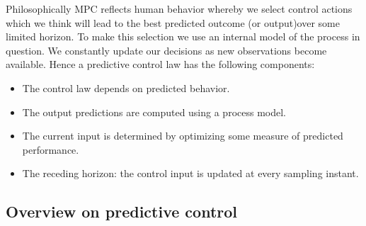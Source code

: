 Philosophically MPC reflects human behavior whereby we select control actions which we think will lead to the best predicted outcome (or output)over some limited horizon. To make this selection we use an internal model of the process in question. We constantly update our decisions as new observations become available. Hence a predictive control law has the following components:
\begin{itemize}
\item The control law depends on predicted behavior.
\item The output predictions are computed using a process model.
\item The current input is determined by optimizing some measure of predicted performance.
\item The receding horizon: the control input is updated at every sampling instant.
\end{itemize}

\subsection{Overview on predictive control}\label{BASICCSR:sec:MPCOverview}

